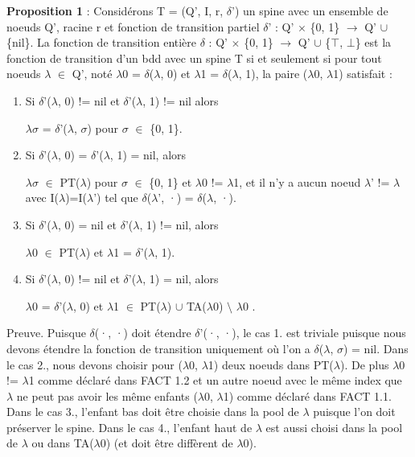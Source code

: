\documentclass[french]{article}
\begin{document}
\textbf{Proposition 1} :  Considérons T = (Q’, I, r, \(\delta\)’) un spine avec un ensemble de noeuds Q’, racine r et fonction de transition partiel \(\delta\)’ : Q’ \(\times\) \{0, 1\} \(\rightarrow\) Q’ \(\cup\) \{nil\}. La fonction de transition entière \(\delta\) : Q’ \(\times\) \{0, 1\} \(\rightarrow\) Q’ \(\cup\) \{\(\top\), \(\bot\)\} est la fonction de transition d'un bdd avec un spine T si et seulement si pour tout noeuds \(\lambda\) \(\in\) Q’, noté \(\lambda\)0 = \(\delta\)(\(\lambda\), 0) et \(\lambda\)1 = \(\delta\)(\(\lambda\), 1), la paire (\(\lambda\)0, \(\lambda\)1) satisfait : 
\begin{enumerate}
    \item 
	Si \(\delta\)’(\(\lambda\), 0) != nil et \(\delta\)’(\(\lambda\), 1) != nil alors 
	\begin{center}
	\(\lambda\)\(\sigma\) = \(\delta\)’(\(\lambda\), \(\sigma\)) pour \(\sigma\) \(\in\) \{0, 1\}.
    \end{center}
    \item
	Si \(\delta\)’(\(\lambda\), 0) = \(\delta\)’(\(\lambda\), 1) = nil, alors 
	\begin{center}
	\(\lambda\)\(\sigma\) \(\in\) PT(\(\lambda\))  pour \(\sigma\) \(\in\) \{0, 1\} et \(\lambda\)0 != \(\lambda\)1, et il n'y a aucun noeud \(\lambda\)’ != \(\lambda\) avec I(\(\lambda\))=I(\(\lambda\)’) tel que \(\delta\)(\(\lambda\)’, ·) = \(\delta\)(\(\lambda\), ·).
    \end{center}
    \item
	Si \(\delta\)’(\(\lambda\), 0) = nil et \(\delta\)’(\(\lambda\), 1) != nil, alors
	\begin{center}
	\(\lambda\)0 \(\in\) PT(\(\lambda\)) et \(\lambda\)1 = \(\delta\)’(\(\lambda\), 1).
	\end{center}
    \item
	Si \(\delta\)’(\(\lambda\), 0) != nil et \(\delta\)’(\(\lambda\), 1) = nil, alors 
	\begin{center}
	\(\lambda\)0 = \(\delta\)’(\(\lambda\), 0) et \(\lambda\)1 \(\in\) PT(\(\lambda\)) \(\cup\) TA(\(\lambda\)0) \(\setminus\) \(\lambda\)0 .
    \end{center}
\end{enumerate}
\newpage
Preuve. Puisque \(\delta\)(·, ·) doit étendre \(\delta\)’(·, ·), le cas 1. est triviale puisque nous devons étendre la fonction de transition uniquement où l'on a \(\delta\)(\(\lambda\), \(\sigma\)) = nil. Dans le cas 2., nous devons choisir pour (\(\lambda\)0, \(\lambda\)1) deux noeuds dans PT(\(\lambda\)). De plus \(\lambda\)0 != \(\lambda\)1 comme déclaré dans FACT 1.2 et un autre noeud avec le même index que \(\lambda\) ne peut pas avoir les même enfants (\(\lambda\)0, \(\lambda\)1) comme déclaré dans FACT 1.1. Dans le cas 3., l'enfant bas doit être choisie dans la pool de \(\lambda\) puisque l'on doit préserver le spine. Dans le cas 4., l'enfant haut de \(\lambda\) est aussi choisi dans la pool de  \(\lambda\) ou dans TA(\(\lambda\)0) (et doit être diffèrent de \(\lambda\)0).
\vspace{5mm} %
\end{document}
